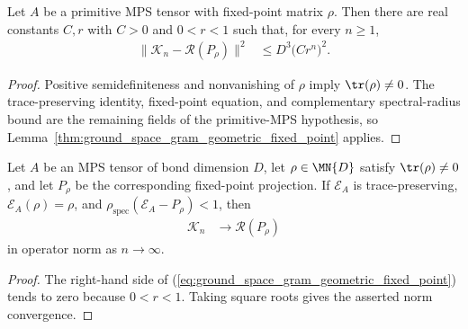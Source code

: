 \begin{lemma}
    \label{thm:primitive_ground_space_gram_geometric_fixed_point}
    \leanok
    Let $A$ be a primitive MPS tensor with fixed-point matrix $\rho$. Then there
    are real constants $C,r$ with $C>0$ and $0<r<1$ such that, for every
    $n\geq1$,
    \begin{align}
        \bigl\lVert\mathcal K_n-\mathscr R(P_\rho)\bigr\rVert^2
         & \leq D^3\bigl(Cr^n\bigr)^2.
    \end{align}
\end{lemma}

\begin{proof}
    \leanok
    Positive semidefiniteness and nonvanishing of $\rho$ imply
    $\tr(\rho)\neq0$. The trace-preserving identity, fixed-point equation, and
    complementary spectral-radius bound are the remaining fields of the
    primitive-MPS hypothesis, so
    Lemma~\ref{thm:ground_space_gram_geometric_fixed_point} applies.
\end{proof}

\begin{lemma}
    \label{thm:ground_space_gram_tendsto_fixed_point}
    \leanok
    Let $A$ be an MPS tensor of bond dimension $D$, let $\rho\in\MN{D}$ satisfy
    $\tr(\rho)\neq0$, and let $P_\rho$ be the corresponding fixed-point
    projection.  If $\mathcal E_A$ is trace-preserving,
    $\mathcal E_A(\rho)=\rho$, and
    $\rho_{\mathrm{spec}}(\mathcal E_A-P_\rho)<1$, then
    \begin{align}
        \mathcal K_n & \longrightarrow\mathscr R(P_\rho)
        \label{eq:ground_space_gram_tendsto_fixed_point}
    \end{align}
    in operator norm as $n\to\infty$.
\end{lemma}

\begin{proof}
    \leanok
    The right-hand side of
    (\ref{eq:ground_space_gram_geometric_fixed_point}) tends to zero because
    $0<r<1$.  Taking square roots gives the asserted norm convergence.
\end{proof}

